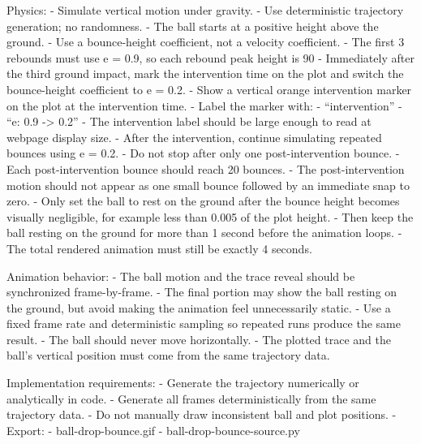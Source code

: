 \documentclass[11pt]{article}
\begin{document}
\begin{DocCode}
  Physics:
  - Simulate vertical motion under gravity.
  - Use deterministic trajectory generation; no randomness.
  - The ball starts at a positive height above the ground.
  - Use a bounce-height coefficient, not a velocity coefficient.
  - The first 3 rebounds must use e = 0.9, so each rebound peak height is 90%
  - Immediately after the third ground impact, mark the intervention time on the plot and switch the bounce-height coefficient
  to e = 0.2.
  - Show a vertical orange intervention marker on the plot at the intervention time.
  - Label the marker with:
    - “intervention”
    - “e: 0.9 -> 0.2”
  - The intervention label should be large enough to read at webpage display size.
  - After the intervention, continue simulating repeated bounces using e = 0.2.
  - Do not stop after only one post-intervention bounce.
  - Each post-intervention bounce should reach 20%
  bounces.
  - The post-intervention motion should not appear as one small bounce followed by an immediate snap to zero.
  - Only set the ball to rest on the ground after the bounce height becomes visually negligible, for example less than 0.005 of
  the plot height.
  - Then keep the ball resting on the ground for more than 1 second before the animation loops.
  - The total rendered animation must still be exactly 4 seconds.

  Animation behavior:
  - The ball motion and the trace reveal should be synchronized frame-by-frame.
  - The final portion may show the ball resting on the ground, but avoid making the animation feel unnecessarily static.
  - Use a fixed frame rate and deterministic sampling so repeated runs produce the same result.
  - The ball should never move horizontally.
  - The plotted trace and the ball’s vertical position must come from the same trajectory data.

  Implementation requirements:
  - Generate the trajectory numerically or analytically in code.
  - Generate all frames deterministically from the same trajectory data.
  - Do not manually draw inconsistent ball and plot positions.
  - Export:
    - ball-drop-bounce.gif
    - ball-drop-bounce-source.py
\end{DocCode}
\end{document}
